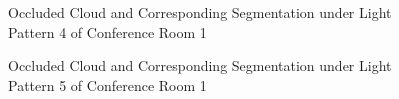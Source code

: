 \documentclass[11pt, a4paper,oneside,chapterprefix=false]{scrbook}
\begin{document}
\begin{figure}[H]
    \centering
      \label{fig:conf1 4 occluded} \hfill
     \label{fig:conf1 4 seg}
    \caption{Occluded Cloud and Corresponding Segmentation under Light Pattern 4 of Conference Room 1}
    \label{fig:conf1 4 occ and seg}
\end{figure}

\begin{figure}[H]
    \centering
      \label{fig:conf1 5 occluded} \hfill
     \label{fig:conf1 5 seg}
    \caption{Occluded Cloud and Corresponding Segmentation under Light Pattern 5 of Conference Room 1}
    \label{fig:conf1 5 occ and seg}
\end{figure}
\end{document}
